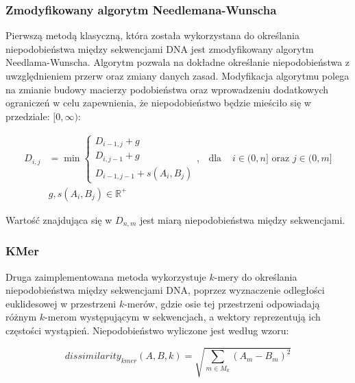             \subsubsection{Zmodyfikowany algorytm Needlemana-Wunscha}
            
                Pierwszą metodą klasyczną, która została wykorzystana do określania niepodobieństwa między sekwencjami DNA jest zmodyfikowany algorytm Needlama-Wunscha. Algorytm pozwala na dokładne określanie niepodobieństwa z uwzględnieniem przerw oraz zmiany danych zasad. Modyfikacja algorytmu polega na zmianie budowy macierzy podobieństwa oraz wprowadzeniu dodatkowych ograniczeń w celu zapewnienia, że niepodobieństwo będzie mieściło się w przedziale: $[0, \infty)$:
    
                \begin{equation}
                    \begin{aligned}
                        D_{i,j} &= \min
                        \begin{cases}
                        D_{i - 1, j} + g \\
                        D_{i, j - 1} + g \\
                        D_{i - 1, j - 1} + s(A_i, B_j)
                        \end{cases}, & \text{dla } & i \in (0, n] \text{ oraz } j \in (0, m] \\
                        & g, s(A_i, B_j) \in \mathbb{R}^{+}
                    \end{aligned}
                \end{equation}
    
                Wartość znajdująca się w $D_{n, m}$ jest miarą niepodobieństwa między sekwencjami.
                
            \subsubsection{KMer}
            
                Druga zaimplementowana metoda wykorzystuje $k$-mery do określania niepodobieństwa między sekwencjami DNA, poprzez wyznaczenie odległości euklidesowej w przestrzeni $k$-merów, gdzie osie tej przestrzeni odpowiadają różnym $k$-merom występującym w sekwencjach, a wektory reprezentują ich częstości wystąpień. Niepodobieństwo wyliczone jest według wzoru:
    
                \begin{equation}
                    dissimilarity_{kmer}(A, B, k) = \sqrt{\sum_{m \in M_{k}} (A_m - B_m)^{2}}
                \end{equation}
    
